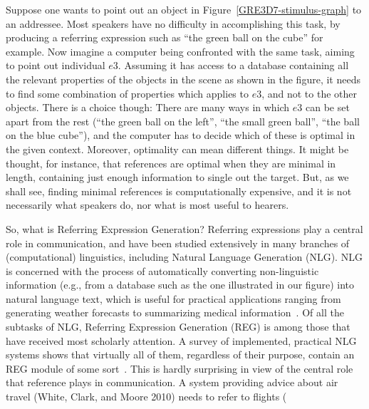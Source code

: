 Suppose one wants to point out an object in Figure~\ref{GRE3D7-stimulus-graph} to an addressee. Most speakers
have no difficulty in accomplishing this task, by producing a referring expression
such as ``the green ball on the cube'' for example. Now imagine a computer being confronted
with the same task, aiming to point out individual $e3$. Assuming it has access to a
database containing all the relevant properties of the objects in the scene as shown in the figure, it needs to
find some combination of properties which applies to $e3$, and not to the other objects.
There is a choice though: There are many ways in which $e3$ can be set apart from the
rest (``the green ball on the left'', ``the small green ball'', ``the ball on the blue cube''), and
the computer has to decide which of these is optimal in the given context. Moreover,
optimality can mean different things. It might be thought, for instance, that references
are optimal when they are minimal in length, containing just enough information to
single out the target. But, as we shall see, finding minimal references is computationally
expensive, and it is not necessarily what speakers do, nor what is most useful to hearers.

So, what is Referring Expression Generation? Referring expressions play a central role
in communication, and have been studied extensively in many branches of (computational) linguistics, including Natural Language Generation (NLG). NLG is concerned with the process of automatically converting non-linguistic information (e.g.,
from a database such as the one illustrated in our figure) into natural language text, which is useful for practical applications
ranging from generating weather forecasts to summarizing medical information~\cite{dale2000}. Of all the subtasks of NLG, Referring Expression Generation (REG) is
among those that have received most scholarly attention. A survey of implemented,
practical NLG systems shows that virtually all of them, regardless of their purpose,
contain an REG module of some sort~\cite{Mellish2004}. This is hardly surprising
in view of the central role that reference plays in communication. A system providing
advice about air travel (White, Clark, and Moore 2010) needs to refer to flights (
